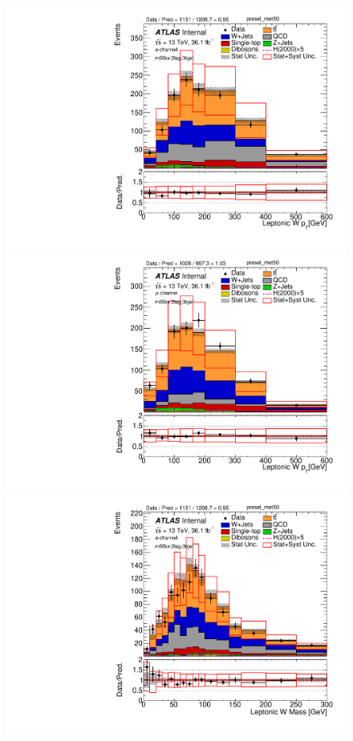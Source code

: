 \begin{figure}[!h]
\begin{center}
\includegraphics[scale=0.33]{./figures/boosted/PlotByChannels/DataMC_2tag_0bjet_mbbcr_elec_presel_met50_WlepPt}  
\includegraphics[scale=0.33]{./figures/boosted/PlotByChannels/DataMC_2tag_0bjet_mbbcr_muon_presel_met50_WlepPt}  
\includegraphics[scale=0.33]{./figures/boosted/PlotByChannels/DataMC_2tag_0bjet_mbbcr_elec_presel_met50_WlepMass}

\end{center}
\end{figure}
